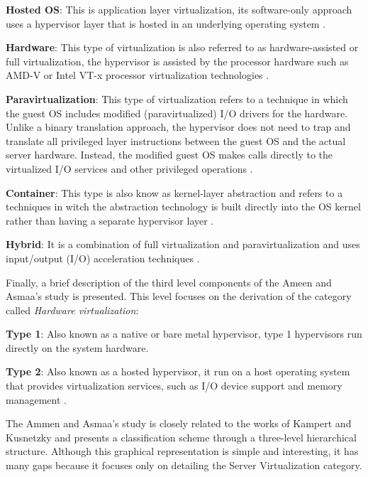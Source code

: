     \textbf{Hosted OS}: This is application layer virtualization, its software-only approach uses a hypervisor layer that is hosted in an underlying operating system \cite{Ameen2013, VonHagen2008}.

    \textbf{Hardware}: This type of virtualization  is also referred to as hardware-assisted or full virtualization, the hypervisor is assisted by the processor hardware such as AMD-V or Intel VT-x processor virtualization technologies \cite{Ameen2013, VonHagen2008}.

    \textbf{Paravirtualization}: This type of virtualization refers to a technique in which the guest OS includes modified (paravirtualized) I/O drivers for the hardware. Unlike a binary translation approach, the hypervisor does not need to trap and translate all privileged layer instructions between the guest OS and the actual server hardware. Instead, the modified guest OS makes calls directly to the virtualized I/O services and other privileged operations \cite{Ameen2013, VonHagen2008}.

    \textbf{Container}: This type is also know as kernel-layer abstraction and refers to a techniques in witch the abstraction technology is built directly into the OS kernel rather than having a separate hypervisor layer \cite{Ameen2013, Lin2012}. 

    \textbf{Hybrid}: It is a combination of full virtualization and paravirtualization and uses input/output (I/O) acceleration techniques \cite{Ameen2013, White2010}.

    Finally, a brief description of the third level components of the Ameen and Asmaa's study is presented. This level focuses on the derivation of the category called \textit{Hardware virtualization}:

    \textbf{Type 1}: Also known as a native or bare metal hypervisor, type 1 hypervisors run directly on the system hardware. 

    \textbf{Type 2}: Also known as a hosted hypervisor, it run on a host operating system that provides virtualization services, such as I/O device support and memory management \cite{Ameen2013}.
    
    The Ammen and Asmaa's study is closely related to the works of Kampert \cite{Kampert2010} and Kusnetzky \cite{Kusnetzky2011} and presents a classification scheme through a three-level hierarchical structure. Although this graphical representation is simple and interesting, it has many gaps because it focuses only on detailing the Server Virtualization category.



